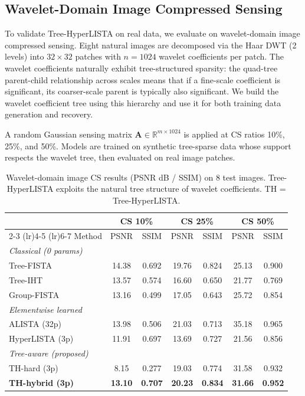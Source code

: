 \documentclass{article}
\begin{document}
\subsection{Wavelet-Domain Image Compressed Sensing}

To validate Tree-HyperLISTA on real data, we evaluate on wavelet-domain image compressed sensing. Eight natural images are decomposed via the Haar DWT (2 levels) into $32{\times}32$ patches with $n{=}1024$ wavelet coefficients per patch. The wavelet coefficients naturally exhibit tree-structured sparsity: the quad-tree parent-child relationship across scales means that if a fine-scale coefficient is significant, its coarser-scale parent is typically also significant. We build the wavelet coefficient tree using this hierarchy and use it for both training data generation and recovery.

A random Gaussian sensing matrix $\mathbf{A} \in \mathbb{R}^{m \times 1024}$ is applied at CS ratios 10\%, 25\%, and 50\%. Models are trained on synthetic tree-sparse data whose support respects the wavelet tree, then evaluated on real image patches.

\begin{table}[H]
\centering
\caption{Wavelet-domain image CS results (PSNR dB / SSIM) on 8 test images. Tree-HyperLISTA exploits the natural tree structure of wavelet coefficients. TH = Tree-HyperLISTA.}
\label{tab:tree_imagecs}
\small
\begin{tabular}{lcccccc}
\toprule
& \multicolumn{2}{c}{CS 10\%} & \multicolumn{2}{c}{CS 25\%} & \multicolumn{2}{c}{CS 50\%} \\
\cmidrule(lr){2-3} \cmidrule(lr){4-5} \cmidrule(lr){6-7}
Method & PSNR & SSIM & PSNR & SSIM & PSNR & SSIM \\
\midrule
\multicolumn{7}{l}{\emph{Classical (0 params)}} \\
Tree-FISTA    & 14.38 & 0.692 & 19.76 & 0.824 & 25.13 & 0.900 \\
Tree-IHT      & 13.57 & 0.574 & 16.60 & 0.650 & 21.77 & 0.769 \\
Group-FISTA   & 13.16 & 0.499 & 17.05 & 0.643 & 25.72 & 0.854 \\
\midrule
\multicolumn{7}{l}{\emph{Elementwise learned}} \\
ALISTA (32p)      & 13.98 & 0.506 & 21.03 & 0.713 & 35.18 & 0.965 \\
HyperLISTA (3p)   & 11.91 & 0.697 & 13.69 & 0.727 & 21.56 & 0.856 \\
\midrule
\multicolumn{7}{l}{\emph{Tree-aware (proposed)}} \\
TH-hard (3p)      & 8.15  & 0.277 & 19.03 & 0.774 & 31.58 & 0.932 \\
\textbf{TH-hybrid (3p)} & \textbf{13.10} & \textbf{0.707} & \textbf{20.23} & \textbf{0.834} & \textbf{31.66} & \textbf{0.952} \\
\bottomrule
\end{tabular}
\end{table}
\end{document}
